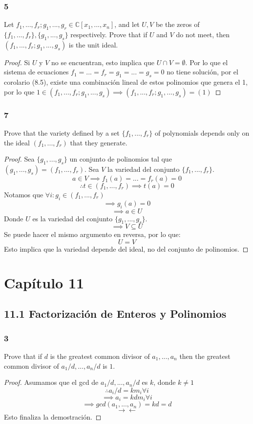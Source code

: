 \documentclass[11pt]{article}
\newcommand{\set}[1]{\mathbb{#1}}
\newcommand{\contr}{\rightarrow\leftarrow}
\theoremstyle{definition}
\begin{document}
        \subsubsection{5}
        Let $f_1,...,f_r;g_1,...,g_r\in\set{C}[x_1,...,x_n]$, and let $U,V$ be the zeros of $\{f_1,...,f_r\},\{g_1,...,g_s\}$ respectively. Prove that if $U$ and $V$ do not meet, then $(f_1,...,f_r;g_1,...,g_s)$ is the unit ideal.
        \begin{proof}
            Si $U$ y $V$ no se encuentran, esto implica que $U\cap V=\emptyset$. Por lo que el sistema de ecuaciones $f_1=...=f_r=g_1=...=g_s=0$ no tiene solución, por el corolario (8.5), existe una combinación lineal de estos polinomios que genera el 1, por lo que $1\in(f_1,...,f_r;g_1,...,g_s)\implies (f_1,...,f_r;g_1,...,g_s)=(1)$
        \end{proof}

        \subsubsection{7}
        Prove that the variety defined by a set $\{f_1,...,f_r\}$ of polynomials depends only on the ideal $(f_1,...,f_r)$ that they generate.
        \begin{proof}
            Sea $\{g_1,...,g_s\}$ un conjunto de polinomios tal que $(g_1,...,g_s)=(f_1,...,f_r)$. Sea $V$ la variedad del conjunto $\{f_1,...,f_r\}$.
            \[a\in V\implies f_1(a)=...=f_r(a)=0\]
            \[\therefore t\in (f_1,...,f_r)\implies t(a)=0\]
            Notamos que $\forall i: g_i\in(f_1,...,f_r)$
            \[\implies g_i(a)=0\]
            \[\implies a\in U\]
            Donde $U$ es la variedad del conjunto $\{g_1,...,g_s\}$.
            \[\implies V\subseteq U\]
            Se puede hacer el mismo argumento en reversa, por lo que:
            \[U=V\]
            Esto implica que la variedad depende del ideal, no del conjunto de polinomios.
        \end{proof}

        \section{Capítulo 11}
        \subsection{11.1 Factorización de Enteros y Polinomios}
        \subsubsection{3}
        Prove that if $d$ is the greatest common divisor of $a_1,...,a_n$ then the greatest common divisor of $a_1/d,...,a_n/d$ is $1$.
        \begin{proof}
            Asumamos que el gcd de $a_1/d,...,a_n/d$ es $k$, donde $k\neq 1$
            \[\therefore a_i/d=km_i\forall i\]
            \[\implies a_i=kdm_i\forall i\]
            \[\implies gcd(a_1,...,a_n)=kd=d\]
            \[\contr\]
            Esto finaliza la demostración.
        \end{proof}
\end{document}
